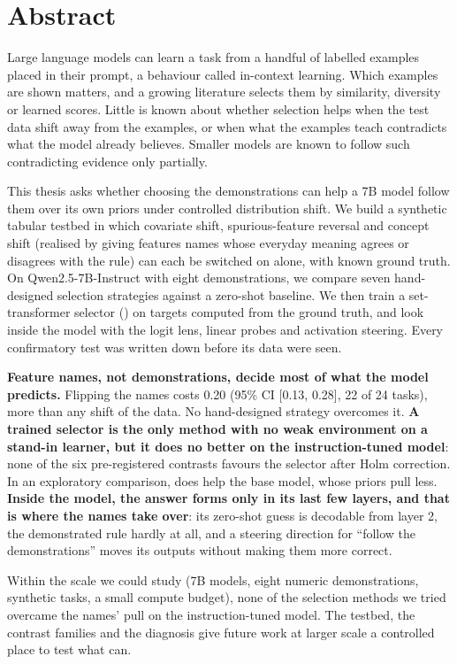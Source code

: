 \chapter*{Abstract}

Large language models can learn a task from a handful of labelled examples placed in their prompt, a behaviour called in-context learning.
Which examples are shown matters, and a growing literature selects them by similarity, diversity or learned scores.
Little is known about whether selection helps when the test data shift away from the examples, or when what the examples teach contradicts what the model already believes.
Smaller models are known to follow such contradicting evidence only partially.

This thesis asks whether choosing the demonstrations can help a 7B model follow them over its own priors under controlled distribution shift.
We build a synthetic tabular testbed in which covariate shift, spurious-feature reversal and concept shift (realised by giving features names whose everyday meaning agrees or disagrees with the rule) can each be switched on alone, with known ground truth.
On Qwen2.5-7B-Instruct with eight demonstrations, we compare seven hand-designed selection strategies against a zero-shot baseline.
We then train a set-transformer selector (\sata) on targets computed from the ground truth, and look inside the model with the logit lens, linear probes and activation steering.
Every confirmatory test was written down before its data were seen.

\textbf{Feature names, not demonstrations, decide most of what the model predicts.}
Flipping the names costs 0.20 \AUROC (95\% CI [0.13, 0.28], 22 of 24 tasks), more than any shift of the data.
No hand-designed strategy overcomes it.
\textbf{A trained selector is the only method with no weak environment on a stand-in learner, but it does no better on the instruction-tuned model}: none of the six pre-registered \sata contrasts favours the selector after Holm correction.
In an exploratory comparison, \sata does help the base model, whose priors pull less.
\textbf{Inside the model, the answer forms only in its last few layers, and that is where the names take over}: its zero-shot guess is decodable from layer 2, the demonstrated rule hardly at all, and a steering direction for ``follow the demonstrations'' moves its outputs without making them more correct.

Within the scale we could study (7B models, eight numeric demonstrations, synthetic tasks, a small compute budget), none of the selection methods we tried overcame the names' pull on the instruction-tuned model.
The testbed, the contrast families and the diagnosis give future work at larger scale a controlled place to test what can.
